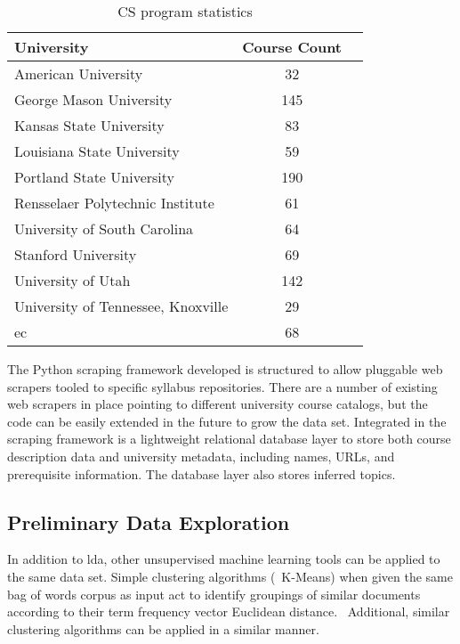 
\begin{table}
  \centering
  \begin{tabular}{lcl}
    \toprule
    University & Course Count \\
    \midrule
    American University & 32 \\
    George Mason University & 145 \\
    Kansas State University & 83 \\
    Louisiana State University & 59 \\
    Portland State University & 190 \\
    Rensselaer Polytechnic Institute & 61 \\
    University of South Carolina & 64 \\
    Stanford University & 69 \\
    University of Utah & 142 \\
    University of Tennessee, Knoxville & 29 \\
    \midrule
    \ac{ec} & 68 \\
    \bottomrule
  \end{tabular}
  \caption{CS program statistics\label{tbl:dataset}}
\end{table}


The Python scraping framework developed is structured to allow pluggable web scrapers tooled to specific syllabus repositories.
There are a number of existing web scrapers in place pointing to different university course catalogs, but the code can be easily extended in the future to grow the data set.
Integrated in the scraping framework is a lightweight relational database layer to store both course description data and university metadata, including names, URLs, and prerequisite information.
The database layer also stores inferred topics.


\subsection{Preliminary Data Exploration}
\label{sec:data-exploration}


In addition to \ac{lda}, other unsupervised machine learning tools can be applied to the same data set.
Simple clustering algorithms (\eg\ K-Means) when given the same bag of words corpus as input act to identify groupings of similar documents according to their term frequency vector Euclidean distance.~\cite{lloyd1982}
Additional, similar clustering algorithms can be applied in a similar manner.

